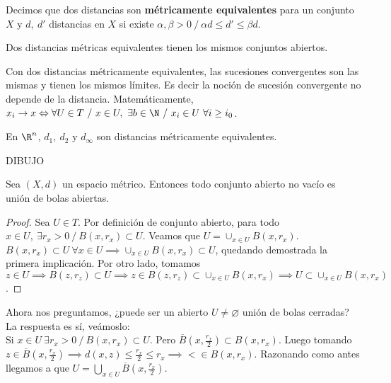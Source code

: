 \begin{ndef}
  Decimos que dos distancias son \textbf{métricamente equivalentes} para un conjunto $X$ y $d,\ d'$ distancias en $X$ si existe $\alpha,\beta>0\ /\ \alpha d \leq d' \leq \beta d$.
\end{ndef}
\begin{properties}
  Dos distancias métricas equivalentes tienen los mismos conjuntos abiertos.
\end{properties}
\begin{properties}
  Con dos distancias métricamente equivalentes, las sucesiones convergentes son las mismas y tienen los mismos límites. Es decir la noción de sucesión convergente no depende de la distancia. Matemáticamente,
  $x_i \to x \Leftrightarrow \forall U \in T\ /\ x\in U,\ \exists b \in \N\ /\ x_i \in U\ \forall i \geq i_0$.
\end{properties}
\begin{exmp}
  En $\R^n$, $d_1,\ d_2$ y $d_\infty$ son distancias métricamente equivalentes.
\end{exmp}
DIBUJO

\begin{nprop}
  Sea $(X,d)$ un espacio métrico. Entonces todo conjunto abierto no vacío es unión de bolas abiertas.
\end{nprop}
\begin{proof}
  Sea $U \in T$. Por definición de conjunto abierto, para todo $x \in U,\ \exists r_x>0\ /\ B(x,r_x) \subset U$. Veamos que $U=\cup_{x \in U}B(x,r_x).$ \\ $B(x,r_x) \subset U\ \forall x\in U \implies \cup_{x\in U}B(x,r_x) \subset U$, quedando demostrada la primera implicación. Por otro lado, tomamos $z \in U \implies B(z,r_z) \subset U \implies z \in B(z,r_z) \subset \cup_{x \in U}B(x,r_x) \implies U \subset \cup_{x \in U}B(x,r_x)$.
\end{proof}

Ahora nos preguntamos, ¿puede ser un abierto $U \neq \varnothing $ unión de bolas cerradas? La respuesta es sí,  veámoslo: \\

Si $x \in U \ \exists r_x>0\ /\ B(x,r_x) \subset U$. Pero $\overline{B}(x, \frac{r_x}{2}) \subset B(x,r_x)$. Luego tomando $z \in \overline{B}(x,\frac{r_x}{2}) \implies d(x,z) \le \frac{r_x}{2} \le r_x \implies < \in B(x,r_x)$. Razonando como antes llegamos a que $U = \bigcup_{x \in U} \overline{B}(x,\frac{r_x}{2})$.


